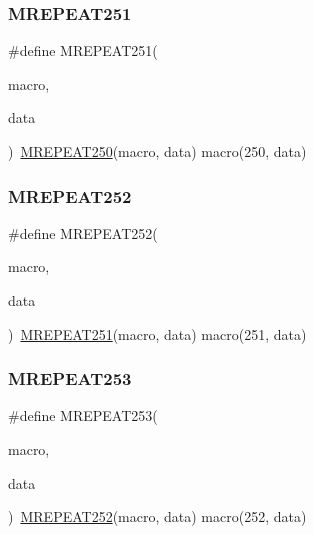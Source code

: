 \mbox{\label{group__group__sam0__utils__mrepeat_ga1b24f68c1e46baf224a8d05207d768f4}} 
\subsubsection{\texorpdfstring{MREPEAT251}{MREPEAT251}}
{\footnotesize\ttfamily \#define M\+R\+E\+P\+E\+A\+T251(\begin{DoxyParamCaption}\item[{}]{macro,  }\item[{}]{data }\end{DoxyParamCaption})~\mbox{\hyperlink{group__group__sam0__utils__mrepeat_ga35656197f887f34430287ec13dc48193}{M\+R\+E\+P\+E\+A\+T250}}(macro, data)   macro(250, data)}

\mbox{\label{group__group__sam0__utils__mrepeat_ga83ac32e68c09ace0114ad0af4f39b7df}} 
\subsubsection{\texorpdfstring{MREPEAT252}{MREPEAT252}}
{\footnotesize\ttfamily \#define M\+R\+E\+P\+E\+A\+T252(\begin{DoxyParamCaption}\item[{}]{macro,  }\item[{}]{data }\end{DoxyParamCaption})~\mbox{\hyperlink{group__group__sam0__utils__mrepeat_ga1b24f68c1e46baf224a8d05207d768f4}{M\+R\+E\+P\+E\+A\+T251}}(macro, data)   macro(251, data)}

\mbox{\label{group__group__sam0__utils__mrepeat_gafbbb5e11ca1e4ca9c893de68c868a4cb}} 
\subsubsection{\texorpdfstring{MREPEAT253}{MREPEAT253}}
{\footnotesize\ttfamily \#define M\+R\+E\+P\+E\+A\+T253(\begin{DoxyParamCaption}\item[{}]{macro,  }\item[{}]{data }\end{DoxyParamCaption})~\mbox{\hyperlink{group__group__sam0__utils__mrepeat_ga83ac32e68c09ace0114ad0af4f39b7df}{M\+R\+E\+P\+E\+A\+T252}}(macro, data)   macro(252, data)}

